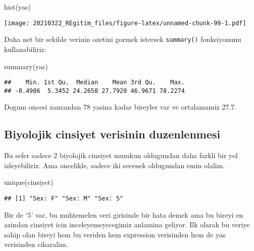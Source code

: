 \documentclass[
]{book}
\newenvironment{Shaded}{\begin{snugshade}}{\end{snugshade}}
\newcommand{\FunctionTok}[1]{\textcolor[rgb]{0.00,0.00,0.00}{#1}}
\newcommand{\NormalTok}[1]{#1}
\begin{document}
\begin{Shaded}
\begin{Highlighting}[]
\FunctionTok{hist}\NormalTok{(yas)}
\end{Highlighting}
\end{Shaded}

\texttt{[image: 20210322\_REgitim\_files/figure-latex/unnamed-chunk-99-1.pdf]}

Daha net bir sekilde verinin ozetini gormek istersek \texttt{summary()} fonksiyonunu kullanabiliriz:

\begin{Shaded}
\begin{Highlighting}[]
\FunctionTok{summary}\NormalTok{(yas)}
\end{Highlighting}
\end{Shaded}

\begin{verbatim}
##    Min. 1st Qu.  Median    Mean 3rd Qu.    Max. 
## -0.4986  5.3452 24.2658 27.7920 46.9671 78.2274
\end{verbatim}

Dogum oncesi zamandan 78 yasina kadar bireyler var ve ortalamamiz 27.7.

\hypertarget{biyolojik-cinsiyet-verisinin-duzenlenmesi}{%
\subsection{Biyolojik cinsiyet verisinin duzenlenmesi}\label{biyolojik-cinsiyet-verisinin-duzenlenmesi}}

Bu sefer sadece 2 biyolojik cinsiyet mumkun oldugundan daha farkli bir yol izleyebiliriz. Ama oncelikle, sadece iki secenek oldugundan emin olalim.

\begin{Shaded}
\begin{Highlighting}[]
\FunctionTok{unique}\NormalTok{(cinsiyet)}
\end{Highlighting}
\end{Shaded}

\begin{verbatim}
## [1] "Sex: F" "Sex: M" "Sex: 5"
\end{verbatim}

Bir de `5' var, bu muhtemelen veri girisinde bir hata demek ama bu bireyi en azindan cinsiyet icin inceleyemeyecegimiz anlamina geliyor. Ilk olarak bu veriye sahip olan bireyi hem bu veriden hem expression verisinden hem de yas verisinden cikaralim.
\end{document}
